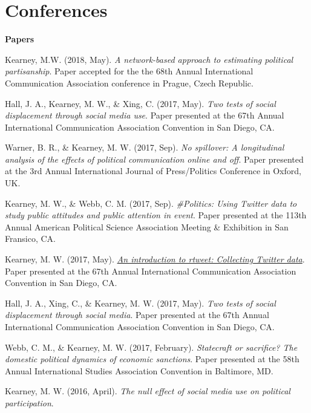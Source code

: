 \section{Conferences}

{\large\textbf{Papers}} \vspace{.5em}
  \begin{bibenum}
    \item[] Kearney, M.W. (2018, May).
      \textit{A network-based approach to estimating political partisanship}.
      Paper accepted for the the 68th Annual International Communication Association conference in Prague, Czech Republic.
    \item[] Hall, J. A., Kearney, M. W., \& Xing, C. (2017, May).
      \textit{Two tests of social displacement through social media use}.
      Paper presented at the 67th Annual International Communication Association Convention in San Diego, CA.
    \item[] Warner, B. R., \& Kearney, M. W. (2017, Sep).
      \textit{No spillover: A longitudinal analysis of the effects of political communication online and off}.
      Paper presented at the 3rd Annual International Journal of Press/Politics Conference in Oxford, UK.
    \item[] Kearney, M. W., \& Webb, C. M. (2017, Sep).
      \textit{\#Politics: Using Twitter data to study public attitudes and public attention in event}.
      Paper presented at the 113th Annual American Political Science Association Meeting \& Exhibition in San Fransico, CA.
    \item[] Kearney, M. W. (2017, May).
      \href{https://mkearney.github.io/ica17/}{\textit{An introduction to rtweet: Collecting Twitter data}}.
      Paper presented at the 67th Annual International Communication Association Convention in San Diego, CA.
    \item[] Hall, J. A., Xing, C., \& Kearney, M. W. (2017, May).
      \textit{Two tests of social displacement through social media}.
      Paper presented at the 67th Annual International Communication Association Convention in San Diego, CA.
    \item[] Webb, C. M., \& Kearney, M. W. (2017, February).
      \textit{Statecraft or sacrifice? The domestic political dynamics of economic sanctions}.
      Paper presented at the 58th Annual International Studies Association Convention in Baltimore, MD.
    \item[] Kearney, M. W. (2016, April).
      \textit{The null effect of social media use on political participation}.

\end{bibenum}
